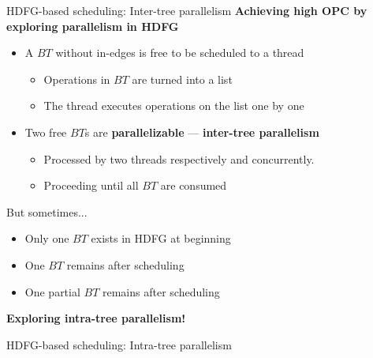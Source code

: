 \documentclass{beamer}
\begin{document}
\begin{CJK}{UTF8}{bkai}
    \begin{frame}{HDFG-based scheduling: Inter-tree parallelism}
        \textbf{Achieving high OPC by exploring parallelism in HDFG}
        \begin{itemize}
            \item A $BT$ without in-edges is free to be scheduled to a thread
                \begin{itemize}
                    \item Operations in $BT$ are turned into a list
                    \item The thread executes operations on the list one by one
                \end{itemize}
            \item Two free $BT$s are \textbf{parallelizable} --- \textbf{inter-tree parallelism}
                \begin{itemize}
                    \item Processed by two threads respectively and concurrently.
                    \item Proceeding until all $BT$ are consumed
                \end{itemize}
        \end{itemize}
        But sometimes...
        \begin{itemize}
            \item Only one $BT$ exists in HDFG at beginning
            \item One $BT$ remains after scheduling
            \item One partial $BT$ remains after scheduling
        \end{itemize}
        \vspace{1em}
        \centering
        \textbf{Exploring intra-tree parallelism!}
    \end{frame}

    \begin{frame}{HDFG-based scheduling: Intra-tree parallelism}
        \begin{columns}
            \begin{column}{0.35\textwidth}
                

\end{column}
\end{columns}
\end{frame}
\end{CJK}
\end{document}

